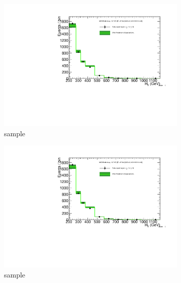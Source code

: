 \begin{figure}[h!]
\begin{subfigure}[b]{0.48\textwidth}
    \includegraphics[width=\textwidth,page=4]
    {Figs/results/v0/greenBand/bestFit_2012dev_RQcdZero_fZinvAll_1b_le3j-12p_smOnly}
    \caption{\mj sample}
  \end{subfigure}
  \begin{subfigure}[b]{0.48\textwidth}
    \includegraphics[width=\textwidth,page=8]
    {Figs/results/v0/greenBand/bestFit_2012dev_RQcdZero_fZinvAll_1b_le3j-12p_smOnly}
    \caption{\mmj sample}
  \end{subfigure}\\
  \begin{subfigure}[b]{0.48\textwidth}

\end{subfigure}
\end{figure}
